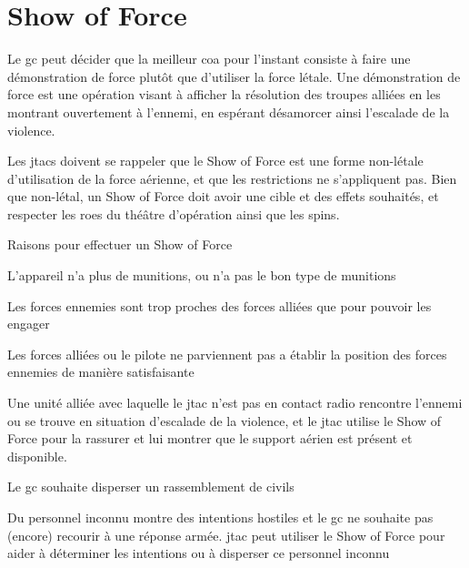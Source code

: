 \section{Show of Force}

Le \gls{gc} peut décider que la meilleur \gls{coa} pour l'instant consiste à faire une démonstration de force plutôt que d'utiliser la force létale. Une démonstration de force est une opération visant à afficher la résolution des troupes alliées en les montrant ouvertement à l'ennemi, en espérant désamorcer ainsi l'escalade de la violence.

Les \glspl{jtac} doivent se rappeler que le Show of Force est une forme non-létale d'utilisation de la force aérienne, et que les restrictions ne s'appliquent pas. Bien que non-létal, un Show of Force doit avoir une cible et des effets souhaités, et respecter les \glspl{roe} du théâtre d'opération ainsi que les \gls{spins}.

\begin{e1}
	\item Raisons pour effectuer un Show of Force
	\begin{e2}
		\item L'appareil n'a plus de munitions, ou n'a pas le bon type de munitions
		\item Les forces ennemies sont trop proches des forces alliées que pour pouvoir les engager
		\item Les forces alliées ou le pilote ne parviennent pas a établir la position des forces ennemies de manière satisfaisante
		\item Une unité alliée avec laquelle le \gls{jtac} n'est pas en contact radio rencontre l'ennemi ou se trouve en situation d'escalade de la violence, et le \gls{jtac} utilise le Show of Force pour la rassurer et lui montrer que le support aérien est présent et disponible.
		\item Le \gls{gc} souhaite disperser un rassemblement de civils
		\item Du personnel inconnu montre des intentions hostiles et le \gls{gc} ne souhaite pas (encore) recourir à une réponse armée. \gls{jtac} peut utiliser le Show of Force pour aider à déterminer les intentions ou à disperser ce personnel inconnu
	\end{e2}
\end{e1}
